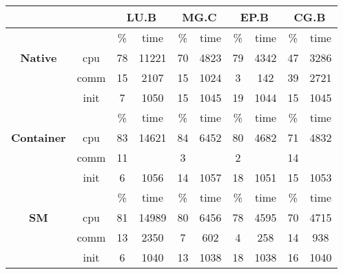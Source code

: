 \begin{tabular}{ |c|c|c|c|c|c|c|c|c|c|}
\hline
&  & \multicolumn{2}{|c|}{{\bf LU.B}} & \multicolumn{2}{|c|}{{\bf MG.C}} & \multicolumn{2}{|c|}{{\bf EP.B}} & \multicolumn{2}{|c|}{{\bf CG.B}}\\
\hline
\multirow{3}{*}{{\bf Native}} & & \% & time& \% & time& \% & time& \% & time\\
\cline{2-10}
& cpu& 78 & 11221& 70 & 4823& 79 & 4342& 47 & 3286\\
& comm& 15 & 2107& 15 & 1024& 3 & 142& 39 & 2721\\
& init& 7 & 1050& 15 & 1045& 19 & 1044& 15 & 1045\\
\hline \hline
\multirow{3}{*}{{\bf Container}} & & \% & time& \% & time& \% & time& \% & time\\
\cline{2-10}
& cpu& 83 & 14621& 84 & 6452& 80 & 4682& 71 & 4832\\
& comm& 11 & \color{blue}{2015}& 3 & \color{blue}{206}& 2 & \color{blue}{141}& 14 & \color{blue}{935}\\
& init& 6 & 1056& 14 & 1057& 18 & 1051& 15 & 1053\\
\hline \hline
\multirow{3}{*}{{\bf SM}} & & \% & time& \% & time& \% & time& \% & time\\
\cline{2-10}
& cpu& 81 & 14989& 80 & 6456& 78 & 4595& 70 & 4715\\
& comm& 13 & 2350& 7 & 602& 4 & 258& 14 & 938\\
& init& 6 & 1040& 13 & 1038& 18 & 1038& 16 & 1040\\
\hline
\end{tabular}
